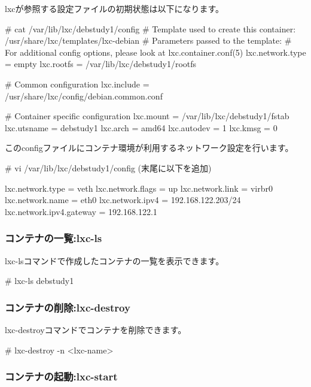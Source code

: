 \documentclass[mingoth,a4paper]{jsarticle}
\begin{document}
lxcが参照する設定ファイルの初期状態は以下になります。

\begin{commandline}
  # cat /var/lib/lxc/debstudy1/config
  # Template used to create this container: /usr/share/lxc/templates/lxc-debian
  # Parameters passed to the template:
  # For additional config options, please look at lxc.container.conf(5)
  lxc.network.type = empty
  lxc.rootfs = /var/lib/lxc/debstudy1/rootfs

  # Common configuration
  lxc.include = /usr/share/lxc/config/debian.common.conf

  # Container specific configuration
  lxc.mount = /var/lib/lxc/debstudy1/fstab
  lxc.utsname = debstudy1
  lxc.arch = amd64
  lxc.autodev = 1
  lxc.kmsg = 0
\end{commandline}

このconfigファイルにコンテナ環境が利用するネットワーク設定を行います。

\begin{commandline}
  # vi /var/lib/lxc/debstudy1/config
  (末尾に以下を追加)

  lxc.network.type = veth
  lxc.network.flags = up
  lxc.network.link = virbr0
  lxc.network.name = eth0
  lxc.network.ipv4 = 192.168.122.203/24
  lxc.network.ipv4.gateway = 192.168.122.1
\end{commandline}


\subsubsection{コンテナの一覧:lxc-ls}

lxc-lsコマンドで作成したコンテナの一覧を表示できます。

\begin{commandline}
  # lxc-ls
  debstudy1
\end{commandline}


\subsubsection{コンテナの削除:lxc-destroy}

lxc-destroyコマンドでコンテナを削除できます。

\begin{commandline}
  # lxc-destroy -n <lxc-name>
\end{commandline}


\subsubsection{コンテナの起動:lxc-start}
\end{document}
